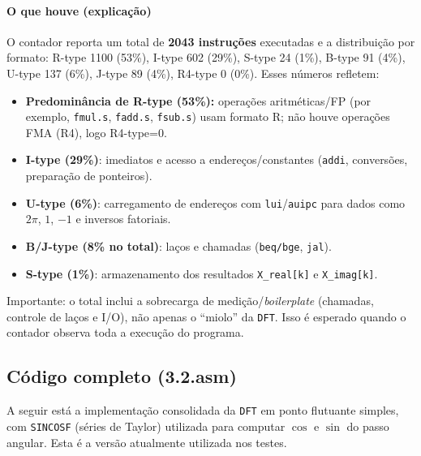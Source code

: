 \documentclass[12pt,a4paper]{article}
\begin{document}
\paragraph{O que houve (explicação)}
O contador reporta um total de \textbf{2043 instruções} executadas e a distribuição por formato: R-type 1100 (53\%), I-type 602 (29\%), S-type 24 (1\%), B-type 91 (4\%), U-type 137 (6\%), J-type 89 (4\%), R4-type 0 (0\%). Esses números refletem:
\begin{itemize}
    \item \textbf{Predominância de R-type (53\%):} operações aritméticas/FP (por exemplo, \texttt{fmul.s}, \texttt{fadd.s}, \texttt{fsub.s}) usam formato R; não houve operações FMA (R4), logo R4-type=0.
    \item \textbf{I-type (29\%)}: imediatos e acesso a endereços/constantes (\texttt{addi}, conversões, preparação de ponteiros).
    \item \textbf{U-type (6\%)}: carregamento de endereços com \texttt{lui}/\texttt{auipc} para dados como $2\pi$, $1$, $-1$ e inversos fatoriais.
    \item \textbf{B/J-type (8\% no total)}: laços e chamadas (\texttt{beq/bge}, \texttt{jal}).
    \item \textbf{S-type (1\%)}: armazenamento dos resultados \texttt{X\_real[k]} e \texttt{X\_imag[k]}.
\end{itemize}
Importante: o total inclui a sobrecarga de medição/\textit{boilerplate} (chamadas, controle de laços e I/O), não apenas o “miolo” da \texttt{DFT}. Isso é esperado quando o contador observa toda a execução do programa.

\subsection*{Código completo (3.2.asm)}
A seguir está a implementação consolidada da \texttt{DFT} em ponto flutuante simples, com \texttt{SINCOSF} (séries de Taylor) utilizada para computar $\cos$ e $\sin$ do passo angular. Esta é a versão atualmente utilizada nos testes.
\end{document}
